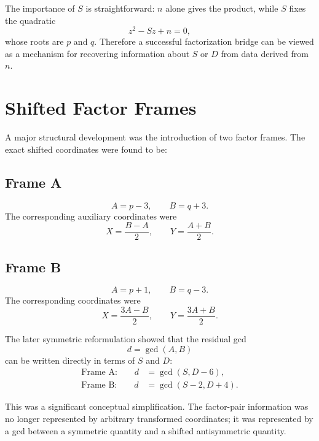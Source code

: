 \documentclass[11pt,a4paper]{article}
\begin{document}
The importance of $S$ is straightforward: $n$ alone gives the product, while $S$ fixes the quadratic
\begin{equation}
 z^2-Sz+n=0,
\end{equation}
whose roots are $p$ and $q$.  Therefore a successful factorization bridge can be viewed as a mechanism for recovering information about $S$ or $D$ from data derived from $n$.

\section{Shifted Factor Frames}

A major structural development was the introduction of two factor frames.  The exact shifted coordinates were found to be:

\subsection{Frame A}
\begin{equation}
 A=p-3,
 \qquad
 B=q+3.
 \end{equation}
The corresponding auxiliary coordinates were
\begin{equation}
 X=\frac{B-A}{2},
 \qquad
 Y=\frac{A+B}{2}.
\end{equation}

\subsection{Frame B}
\begin{equation}
 A=p+1,
 \qquad
 B=q-3.
 \end{equation}
The corresponding coordinates were
\begin{equation}
 X=\frac{3A-B}{2},
 \qquad
 Y=\frac{3A+B}{2}.
\end{equation}

The later symmetric reformulation showed that the residual gcd
\[
 d=\gcd(A,B)
\]
can be written directly in terms of $S$ and $D$:
\begin{align}
 \text{Frame A:}\qquad
 d&=\gcd(S,D-6),
 \\[-1mm]
 \text{Frame B:}\qquad
 d&=\gcd(S-2,D+4).
\end{align}

This was a significant conceptual simplification.  The factor-pair information was no longer represented by arbitrary transformed coordinates; it was represented by a gcd between a symmetric quantity and a shifted antisymmetric quantity.
\end{document}
